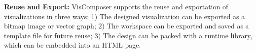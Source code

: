 \noindent \textbf{Reuse and Export:} VisComposer supports the reuse and exportation of visualizations in three ways: 1) The designed visualization can be exported as a bitmap image or vector graph; 2) The workspace can be exported and saved as a template file for future reuse; 3) The design can be packed with a runtime library,  which can be embedded into an HTML page. 